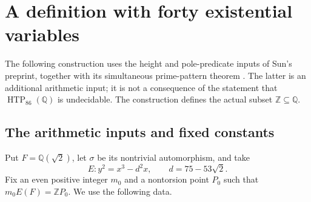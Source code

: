 \section{A definition with forty existential variables}

\newtheorem{sdtheorem}{Theorem}
\newtheorem{sdlemma}[sdtheorem]{Lemma}
\newtheorem{sdproposition}[sdtheorem]{Proposition}
\newcommand{\sdQ}{\mathbb Q}
\newcommand{\sdZ}{\mathbb Z}
\newcommand{\sdTr}{\operatorname{Tr}_{F/\sdQ}}
\newcommand{\sdord}{\operatorname{ord}}
\newcommand{\sdnum}{\operatorname{num}}
\newcommand{\sdSq}{\operatorname{Sq}(\sdQ)}

The following construction uses the height and pole-predicate inputs of
Sun's preprint, together with its simultaneous prime-pattern theorem
\cite[Theorem~4.1]{Sun2026}. The latter is an additional arithmetic input;
it is not a consequence of the statement that $\operatorname{HTP}_{86}(\sdQ)$
is undecidable. The construction defines the actual subset $\sdZ\subseteq\sdQ$.

\subsection{The arithmetic inputs and fixed constants}

Put $F=\sdQ(\sqrt2)$, let $\sigma$ be its nontrivial automorphism, and take
\[
 E:y^2=x^3-d^2x,\qquad d=75-53\sqrt2.
\]
Fix an even positive integer $m_0$ and a nontorsion point $P_0$ such that
$m_0E(F)=\sdZ P_0$. We use the following data.

